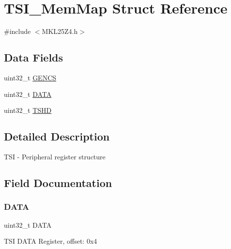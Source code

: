 \hypertarget{struct_t_s_i___mem_map}{}\section{T\+S\+I\+\_\+\+Mem\+Map Struct Reference}
\label{struct_t_s_i___mem_map}


{\ttfamily \#include $<$M\+K\+L25\+Z4.\+h$>$}

\subsection*{Data Fields}
\begin{DoxyCompactItemize}
\item 
uint32\+\_\+t \hyperlink{struct_t_s_i___mem_map_af2053cd193b25e18e6a76a1c0e7fcdd2}{G\+E\+N\+CS}
\item 
uint32\+\_\+t \hyperlink{struct_t_s_i___mem_map_aad20077939fb7b9e145416f55028ea37}{D\+A\+TA}
\item 
uint32\+\_\+t \hyperlink{struct_t_s_i___mem_map_a85a27c0645c0102ceea4ce506b84194e}{T\+S\+HD}
\end{DoxyCompactItemize}


\subsection{Detailed Description}
T\+SI -\/ Peripheral register structure 

\subsection{Field Documentation}
\mbox{\label{struct_t_s_i___mem_map_aad20077939fb7b9e145416f55028ea37}} 
\subsubsection{\texorpdfstring{D\+A\+TA}{DATA}}
{\footnotesize\ttfamily uint32\+\_\+t D\+A\+TA}

T\+SI D\+A\+TA Register, offset\+: 0x4 \mbox{\label{struct_t_s_i___mem_map_af2053cd193b25e18e6a76a1c0e7fcdd2}} 
